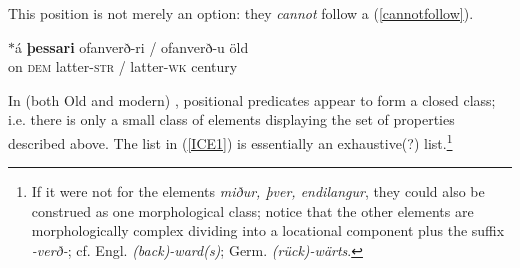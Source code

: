 \documentclass[output=paper,colorlinks,citecolor=brown]{langscibook}
\begin{document}
This position is not merely an option: they \textit{cannot} follow a  (\ref{cannotfollow}). 

\begin{exe}
      \ex \label{cannotfollow}\gll $*$á \textbf{þessari} ofanverð-ri / ofanverð-u  öld   \\
       \phantom{$*$}on \textsc{dem}  latter-\textsc{str} /  latter-\textsc{wk} century \\ 
\end{exe} 

In (both Old and modern) , positional predicates appear to form a closed class; i.e. there is only a small class of elements displaying the set of properties described above. The list in (\ref{ICE1}) is essentially an exhaustive(?) list.\footnote{If it were not for the elements \textit{miður, þver, endilangur}, they could also be construed as one morphological class; notice that the other elements are morphologically complex dividing into a locational component plus the suffix \textit{-verð-}; cf. Engl. \textit{(back)-ward(s)}; Germ. \textit{(rück)-wärts}.} 
\end{document}
